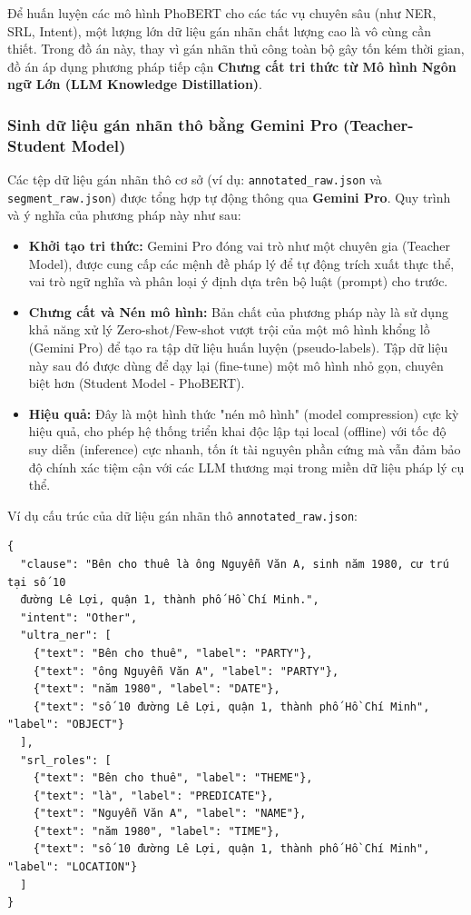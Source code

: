 Để huấn luyện các mô hình PhoBERT cho các tác vụ chuyên sâu (như NER, SRL, Intent), một lượng lớn dữ liệu gán nhãn chất lượng cao là vô cùng cần thiết. Trong đồ án này, thay vì gán nhãn thủ công toàn bộ gây tốn kém thời gian, đồ án áp dụng phương pháp tiếp cận \textbf{Chưng cất tri thức từ Mô hình Ngôn ngữ Lớn (LLM Knowledge Distillation)}.

\subsubsection{Sinh dữ liệu gán nhãn thô bằng Gemini Pro (Teacher-Student Model)}
Các tệp dữ liệu gán nhãn thô cơ sở (ví dụ: \texttt{annotated\_raw.json} và \texttt{segment\_raw.json}) được tổng hợp tự động thông qua \textbf{Gemini Pro}. Quy trình và ý nghĩa của phương pháp này như sau:
\begin{itemize}
    \item \textbf{Khởi tạo tri thức:} Gemini Pro đóng vai trò như một chuyên gia (Teacher Model), được cung cấp các mệnh đề pháp lý để tự động trích xuất thực thể, vai trò ngữ nghĩa và phân loại ý định dựa trên bộ luật (prompt) cho trước.
    \item \textbf{Chưng cất và Nén mô hình:} Bản chất của phương pháp này là sử dụng khả năng xử lý Zero-shot/Few-shot vượt trội của một mô hình khổng lồ (Gemini Pro) để tạo ra tập dữ liệu huấn luyện (pseudo-labels). Tập dữ liệu này sau đó được dùng để dạy lại (fine-tune) một mô hình nhỏ gọn, chuyên biệt hơn (Student Model - PhoBERT).
    \item \textbf{Hiệu quả:} Đây là một hình thức "nén mô hình" (model compression) cực kỳ hiệu quả, cho phép hệ thống triển khai độc lập tại local (offline) với tốc độ suy diễn (inference) cực nhanh, tốn ít tài nguyên phần cứng mà vẫn đảm bảo độ chính xác tiệm cận với các LLM thương mại trong miền dữ liệu pháp lý cụ thể.
\end{itemize}

Ví dụ cấu trúc của dữ liệu gán nhãn thô \texttt{annotated\_raw.json}:
\begin{verbatim}
{
  "clause": "Bên cho thuê là ông Nguyễn Văn A, sinh năm 1980, cư trú tại số 10 
  đường Lê Lợi, quận 1, thành phố Hồ Chí Minh.",
  "intent": "Other",
  "ultra_ner": [
    {"text": "Bên cho thuê", "label": "PARTY"},
    {"text": "ông Nguyễn Văn A", "label": "PARTY"},
    {"text": "năm 1980", "label": "DATE"},
    {"text": "số 10 đường Lê Lợi, quận 1, thành phố Hồ Chí Minh", "label": "OBJECT"}
  ],
  "srl_roles": [
    {"text": "Bên cho thuê", "label": "THEME"},
    {"text": "là", "label": "PREDICATE"},
    {"text": "Nguyễn Văn A", "label": "NAME"},
    {"text": "năm 1980", "label": "TIME"},
    {"text": "số 10 đường Lê Lợi, quận 1, thành phố Hồ Chí Minh", "label": "LOCATION"}
  ]
}
\end{verbatim}

